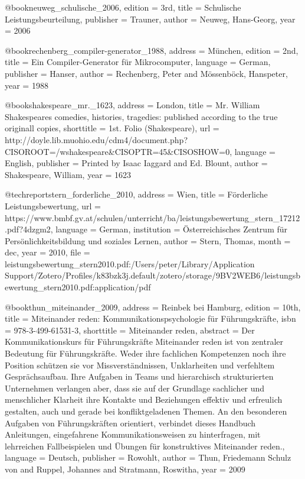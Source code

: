 {@book{neuweg_schulische_2006,
	edition = {3rd},
	title = {Schulische {Leistungsbeurteilung}},
	publisher = {Trauner},
	author = {Neuweg, Hans-Georg},
	year = {2006}
}

@book{rechenberg_compiler-generator_1988,
	address = {M{\"u}nchen},
	edition = {2nd},
	title = {Ein {Compiler}-{Generator} f{\"u}r {Mikrocomputer}},
	language = {German},
	publisher = {Hanser},
	author = {Rechenberg, Peter and M{\"o}ssenb{\"o}ck, Hanspeter},
	year = {1988}
}

@book{shakespeare_mr._1623,
	address = {London},
	title = {Mr. {William} {Shakespeares} comedies, histories, tragedies: published according to the true originall copies},
	shorttitle = {1st. {Folio} ({Shakespeare})},
	url = {http://doyle.lib.muohio.edu/cdm4/document.php?CISOROOT=/wshakespeare&CISOPTR=45&CISOSHOW=0},
	language = {English},
	publisher = {Printed by Isaac Iaggard and Ed. Blount},
	author = {Shakespeare, William},
	year = {1623}
}

@techreport{stern_forderliche_2010,
	address = {Wien},
	title = {F{\"o}rderliche {Leistungsbewertung}},
	url = {https://www.bmbf.gv.at/schulen/unterricht/ba/leistungsbewertung_stern_17212.pdf?4dzgm2},
	language = {German},
	institution = {{\"O}sterreichisches Zentrum f{\"u}r Pers{\"o}nlichkeitsbildung und soziales Lernen},
	author = {Stern, Thomas},
	month = dec,
	year = {2010},
	file = {leistungsbewertung_stern2010.pdf:/Users/peter/Library/Application Support/Zotero/Profiles/k83bzk3j.default/zotero/storage/9BV2WEB6/leistungsbewertung_stern2010.pdf:application/pdf}
}

@book{thun_miteinander_2009,
	address = {Reinbek bei Hamburg},
	edition = {10th},
	title = {Miteinander reden: {Kommunikationspsychologie} f{\"u}r {F{\"u}hrungskr{\"a}fte}},
	isbn = {978-3-499-61531-3},
	shorttitle = {Miteinander reden},
	abstract = {Der Kommunikationskurs f{\"u}r F{\"u}hrungskr{\"a}fte  Miteinander reden ist von zentraler Bedeutung f{\"u}r F{\"u}hrungskr{\"a}fte. Weder ihre fachlichen Kompetenzen noch ihre Position sch{\"u}tzen sie vor Missverst{\"a}ndnissen, Unklarheiten und verfehltem Gespr{\"a}chsaufbau. Ihre Aufgaben in Teams und hierarchisch strukturierten Unternehmen verlangen aber, dass sie auf der Grundlage sachlicher und menschlicher Klarheit ihre Kontakte und Beziehungen effektiv und erfreulich gestalten, auch und gerade bei konfliktgeladenen Themen.  An den besonderen Aufgaben von F{\"u}hrungskr{\"a}ften orientiert, verbindet dieses Handbuch Anleitungen, eingefahrene Kommunikationsweisen zu hinterfragen, mit lehrreichen Fallbeispielen und {\"U}bungen f{\"u}r konstruktives Miteinander reden.},
	language = {Deutsch},
	publisher = {Rowohlt},
	author = {Thun, Friedemann Schulz von and Ruppel, Johannes and Stratmann, Roswitha},
	year = {2009}
}

}
